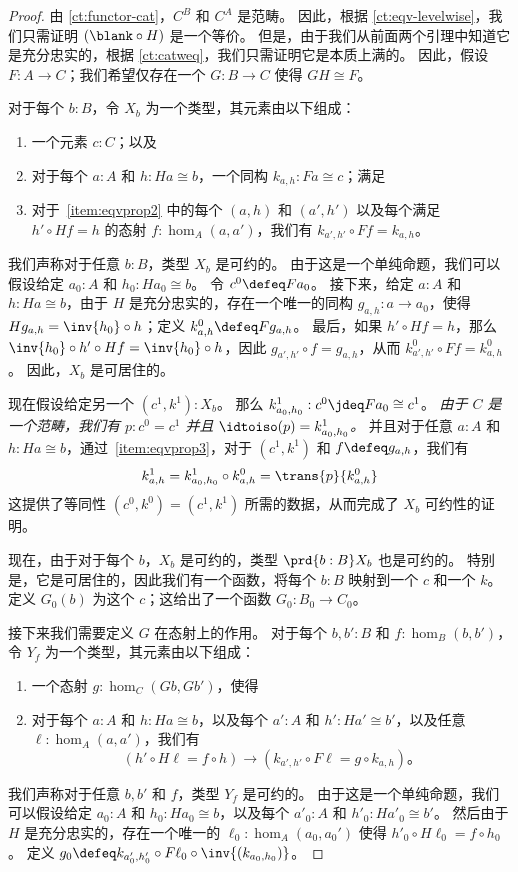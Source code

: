 \begin{proof}
  由 \cref{ct:functor-cat}，$C^B$ 和 $C^A$ 是范畴。
  因此，根据 \cref{ct:eqv-levelwise}，我们只需证明 $(\blank\circ H)$ 是一个等价。
  但是，由于我们从前面两个引理中知道它是充分忠实的，根据 \cref{ct:catweq}，我们只需证明它是本质上满的。
  因此，假设 $F:A\to C$；我们希望仅存在一个 $G:B\to C$ 使得 $GH\cong F$。

  对于每个 $b:B$，令 $X_b$ 为一个类型，其元素由以下组成：
  \begin{enumerate}
    \item 一个元素 $c:C$；以及
    \item 对于每个 $a:A$ 和 $h:Ha\cong b$，一个同构 $k_{a,h}:Fa\cong c$；满足\label{item:eqvprop2}
    \item 对于~\ref{item:eqvprop2} 中的每个 $(a,h)$ 和 $(a',h')$ 以及每个满足 $h'\circ Hf = h$ 的态射 $f:\hom_A(a,a')$，我们有 $k_{a',h'}\circ Ff = k_{a,h}$。\label{item:eqvprop3}
  \end{enumerate}
  我们声称对于任意 $b:B$，类型 $X_b$ 是可约的。
  由于这是一个单纯命题，我们可以假设给定 $a_0:A$ 和 $h_0:Ha_0 \cong b$。
  令 $c^0\defeq Fa_0$。
  接下来，给定 $a:A$ 和 $h:Ha\cong b$，由于 $H$ 是充分忠实的，存在一个唯一的同构 $g_{a,h}:a\to a_0$，使得 $Hg_{a,h} = \inv{h_0}\circ h$；定义 $k^0_{a,h} \defeq Fg_{a,h}$。
  最后，如果 $h'\circ Hf = h$，那么 $\inv{h_0}\circ h'\circ Hf = \inv{h_0}\circ h$，因此 $g_{a',h'} \circ f = g_{a,h}$，从而 $k^0_{a',h'}\circ Ff = k^0_{a,h}$。
  因此，$X_b$ 是可居住的。

  现在假设给定另一个 $(c^1,k^1): X_b$。
  那么 $k^1_{a_0,h_0}:c^0 \jdeq Fa_0 \cong c^1$。
  \emph{由于 $C$ 是一个范畴，我们有 $p:c^0=c^1$ 并且 $\idtoiso(p) = k^1_{a_0,h_0}$。}
  并且对于任意 $a:A$ 和 $h:Ha\cong b$，通过~\ref{item:eqvprop3}，对于 $(c^1,k^1)$ 和 $f\defeq g_{a,h}$，我们有
  \[k^1_{a,h} = k^1_{a_0,h_0} \circ k^0_{a,h} = \trans{p}{k^0_{a,h}}\]
  这提供了等同性 $(c^0,k^0)=(c^1,k^1)$ 所需的数据，从而完成了 $X_b$ 可约性的证明。

  现在，由于对于每个 $b$，$X_b$ 是可约的，类型 $\prd{b:B} X_b$ 也是可约的。
  特别是，它是可居住的，因此我们有一个函数，将每个 $b:B$ 映射到一个 $c$ 和一个 $k$。
  定义 $G_0(b)$ 为这个 $c$；这给出了一个函数 $G_0 :B_0 \to C_0$。

  接下来我们需要定义 $G$ 在态射上的作用。
  对于每个 $b,b':B$ 和 $f:\hom_B(b,b')$，令 $Y_f$ 为一个类型，其元素由以下组成：
  \begin{enumerate}[resume]
    \item 一个态射 $g:\hom_C(Gb,Gb')$，使得
    \item 对于每个 $a:A$ 和 $h:Ha\cong b$，以及每个 $a':A$ 和 $h':Ha'\cong b'$，以及任意 $\ell:\hom_A(a,a')$，我们有\label{item:eqvprop5}
    \[ (h' \circ H\ell = f \circ h)
    \to
    (k_{a',h'} \circ F\ell = g\circ k_{a,h})。 \]
  \end{enumerate}
  我们声称对于任意 $b,b'$ 和 $f$，类型 $Y_f$ 是可约的。
  由于这是一个单纯命题，我们可以假设给定 $a_0:A$ 和 $h_0:Ha_0\cong b$，以及每个 $a'_0:A$ 和 $h'_0:Ha'_0\cong b'$。
  然后由于 $H$ 是充分忠实的，存在一个唯一的 $\ell_0:\hom_A(a_0,a_0')$ 使得 $h'_0 \circ H\ell_0 = f \circ h_0$。
  定义 $g_0 \defeq k_{a_0',h_0'} \circ F \ell_0 \circ \inv{(k_{a_0,h_0})}$。


\end{proof}
